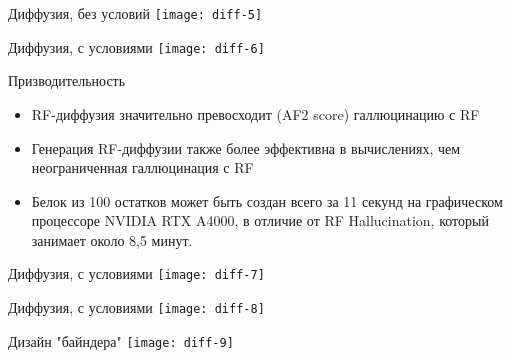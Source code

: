 \begin{frame}{Диффузия, без условий}
    \centering
    \texttt{[image: diff-5]}
\end{frame}

\begin{frame}{Диффузия, с условиями }
    \centering
    \texttt{[image: diff-6]}
\end{frame}


\begin{frame}{Призводительность}
        \begin{itemize}
            \item RF-диффузия значительно превосходит (AF2 score) галлюцинацию с RF
            \item Генерация RF-диффузии также более эффективна в вычислениях, чем неограниченная галлюцинация с RF
            \item Белок из 100 остатков может быть создан всего за 11 секунд на графическом процессоре NVIDIA RTX A4000, в отличие от RF Hallucination, который занимает около 8,5 минут.
            \end{itemize}        
\end{frame}

\begin{frame}{Диффузия, с условиями }
    \centering
    \texttt{[image: diff-7]}
\end{frame}
\begin{frame}{Диффузия, с условиями }
    \centering
    \texttt{[image: diff-8]}
\end{frame}

\begin{frame}{Дизайн "байндера"}
    \centering
    \texttt{[image: diff-9]}
\end{frame}
			
%		



			 
	



